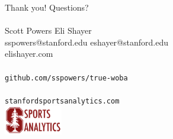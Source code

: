 \documentclass{beamer}
\begin{document}
\begin{frame}{Thank you!}
\centering
\Huge Questions?\\~\\
\normalsize
Scott Powers            \hfill  Eli Shayer\\
sspowers@stanford.edu   \hfill  eshayer@stanford.edu\\
                        \hfill  elishayer.com\\~\\
{\tt github.com/sspowers/true-woba}\\~\\
{\tt stanfordsportsanalytics.com}\\
\hfill\includegraphics[width = 1in]{../figs/ssac.png}
\end{frame}
\end{document}
